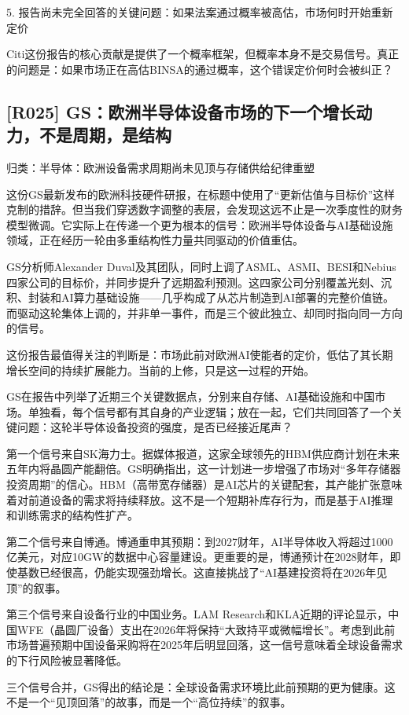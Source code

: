\documentclass[11pt]{ctexart}
\begin{document}
5. 报告尚未完全回答的关键问题：如果法案通过概率被高估，市场何时开始重新定价

Citi这份报告的核心贡献是提供了一个概率框架，但概率本身不是交易信号。真正的问题是：如果市场正在高估BINSA的通过概率，这个错误定价何时会被纠正？

\subsection{[R025] GS：欧洲半导体设备市场的下一个增长动力，不是周期，是结构}
{\small\color{refgray}归类：半导体：欧洲设备需求周期尚未见顶与存储供给纪律重塑}

这份GS最新发布的欧洲科技硬件研报，在标题中使用了“更新估值与目标价”这样克制的措辞。但当我们穿透数字调整的表层，会发现这远不止是一次季度性的财务模型微调。它实际上在传递一个更为根本的信号：欧洲半导体设备与AI基础设施领域，正在经历一轮由多重结构性力量共同驱动的价值重估。

GS分析师Alexander Duval及其团队，同时上调了ASML、ASMI、BESI和Nebius四家公司的目标价，并同步提升了远期盈利预测。这四家公司分别覆盖光刻、沉积、封装和AI算力基础设施——几乎构成了从芯片制造到AI部署的完整价值链。而驱动这轮集体上调的，并非单一事件，而是三个彼此独立、却同时指向同一方向的信号。

这份报告最值得关注的判断是：市场此前对欧洲AI使能者的定价，低估了其长期增长空间的持续扩展能力。当前的上修，只是这一过程的开始。

GS在报告中列举了近期三个关键数据点，分别来自存储、AI基础设施和中国市场。单独看，每个信号都有其自身的产业逻辑；放在一起，它们共同回答了一个关键问题：这轮半导体设备投资的强度，是否已经接近尾声？

第一个信号来自SK海力士。据媒体报道，这家全球领先的HBM供应商计划在未来五年内将晶圆产能翻倍。GS明确指出，这一计划进一步增强了市场对“多年存储器投资周期”的信心。HBM（高带宽存储器）是AI芯片的关键配套，其产能扩张意味着对前道设备的需求将持续释放。这不是一个短期补库存行为，而是基于AI推理和训练需求的结构性扩产。

第二个信号来自博通。博通重申其预期：到2027财年，AI半导体收入将超过1000亿美元，对应10GW的数据中心容量建设。更重要的是，博通预计在2028财年，即使基数已经很高，仍能实现强劲增长。这直接挑战了“AI基建投资将在2026年见顶”的叙事。

第三个信号来自设备行业的中国业务。LAM Research和KLA近期的评论显示，中国WFE（晶圆厂设备）支出在2026年将保持“大致持平或微幅增长”。考虑到此前市场普遍预期中国设备采购将在2025年后明显回落，这一信号意味着全球设备需求的下行风险被显著降低。

三个信号合并，GS得出的结论是：全球设备需求环境比此前预期的更为健康。这不是一个“见顶回落”的故事，而是一个“高位持续”的叙事。
\end{document}
